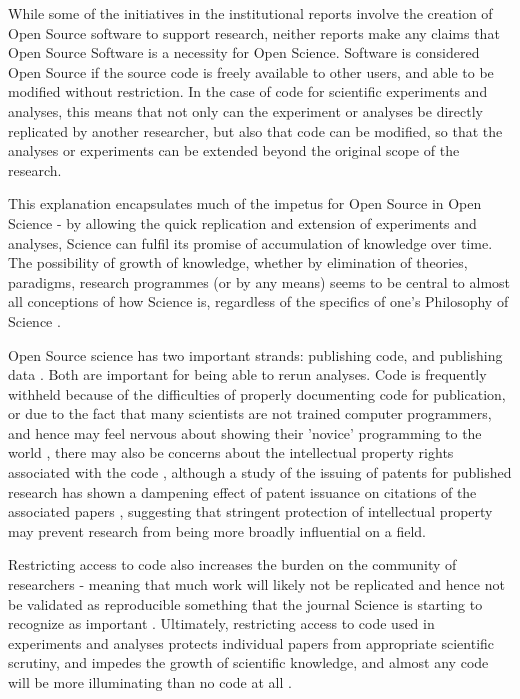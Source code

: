 \documentclass[12pt,a4paper,titlepage]{scrreprt}
\begin{document}
While some of the initiatives in the institutional reports involve the creation of Open Source software to support research, neither reports make any claims that Open Source Software is a necessity for Open Science. Software is considered Open Source if the source code is freely available to other users, and able to be modified without restriction. In the case of code for scientific experiments and analyses, this means that not only can the experiment or analyses be directly replicated by another researcher, but also that code can be modified, so that the analyses or experiments can be extended beyond the original scope of the research.

This explanation encapsulates much of the impetus for Open Source in Open Science - by allowing the quick replication and extension of experiments and analyses, Science can fulfil its promise of accumulation of knowledge over time. The possibility of growth of knowledge, whether by elimination of theories, paradigms, research programmes (or by any means) seems to be central to almost all conceptions of how Science is, regardless of the specifics of one's Philosophy of Science  \parencite{popper_logic_1959,kuhn_structure_1962,lakatos_criticism_1970,feyerabend_science_1978}.

Open Source science has two important strands: publishing code, and publishing data \parencite{stodden_reproducible_2010,stodden_trust_2011}. Both are important for being able to rerun analyses. Code is frequently withheld because of the difficulties of properly documenting code for publication, or due to the fact that many scientists are not trained computer programmers, and hence may feel nervous about showing their 'novice' programming to the world \parencite{barnes_publish_2010}, there may also be concerns about the intellectual property rights associated with the code \parencite{mccafferty_should_2010}, although a study of the issuing of patents for published research has shown a dampening effect of patent issuance on citations of the associated papers \parencite{murray_formal_2007}, suggesting that stringent protection of intellectual property may prevent research from being more broadly influential on a field. 

Restricting access to code also increases the burden on the community of researchers - meaning that much work will likely not be replicated and hence not be validated as reproducible something that the journal Science is starting to recognize as important \parencite{mcnutt_reproducibility_2014}. Ultimately, restricting access to code used in experiments and analyses protects individual papers from appropriate scientific scrutiny, and impedes the growth of scientific knowledge, and almost any code will be more illuminating than no code at all \parencite{barnes_publish_2010,mccafferty_should_2010}.
\end{document}
